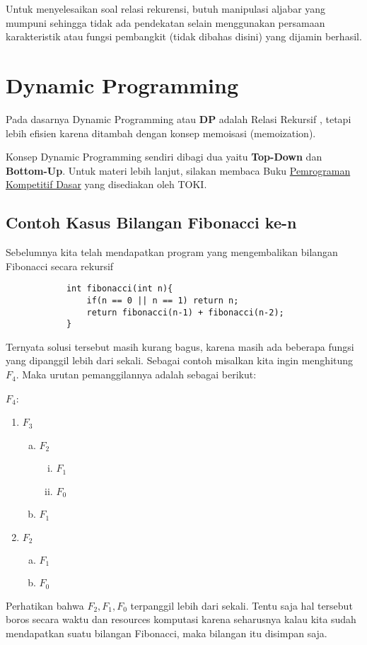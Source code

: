 		    
		    Untuk menyelesaikan soal relasi rekurensi, butuh manipulasi aljabar yang mumpuni sehingga tidak ada pendekatan selain menggunakan persamaan karakteristik atau fungsi pembangkit (tidak dibahas disini) yang dijamin berhasil.
		    
		    
		    
		    \section{Dynamic Programming}
		    Pada dasarnya Dynamic Programming atau \textbf{DP} adalah Relasi Rekursif , tetapi lebih efisien karena ditambah dengan konsep memoisasi (memoization).
		    
		    Konsep Dynamic Programming sendiri dibagi dua yaitu \textbf{Top-Down} dan \textbf{Bottom-Up}. Untuk materi lebih lanjut, silakan membaca Buku \href{https://ksn.toki.id/data/pemrograman-kompetitif-dasar.pdf}{Pemrograman Kompetitif Dasar} yang disediakan oleh TOKI.
		    
		    \subsection{Contoh Kasus Bilangan Fibonacci ke-n}
		    Sebelumnya kita telah mendapatkan program yang mengembalikan bilangan Fibonacci secara rekursif 
		    \begin{lstlisting}
		    int fibonacci(int n){
		    	if(n == 0 || n == 1) return n;
		    	return fibonacci(n-1) + fibonacci(n-2);
		    }
		    \end{lstlisting}
		    Ternyata solusi tersebut masih kurang bagus, karena masih ada beberapa fungsi yang dipanggil lebih dari sekali. Sebagai contoh misalkan kita ingin menghitung $F_4$. Maka urutan pemanggilannya adalah sebagai berikut:
		    
		    $F_4$:
		    \begin{enumerate}
		    \item $F_3$
			    \begin{enumerate}[a)]
			    \item $F_2$
			    \begin{enumerate}[i)]
			    \item $F_1$
			    \item $F_0$
			    \end{enumerate}
			    \item $F_1$
			    \end{enumerate}
		    \item $F_2$
		    		\begin{enumerate}[a)]
		    	    \item $F_1$
		    	    \item $F_0$
		    	    \end{enumerate}
		    \end{enumerate}	
		    Perhatikan bahwa $F_2, F_1, F_0$ terpanggil lebih dari sekali. Tentu saja hal tersebut boros secara waktu dan resources komputasi karena seharusnya kalau kita sudah mendapatkan suatu bilangan Fibonacci, maka bilangan itu disimpan saja. 
		    
